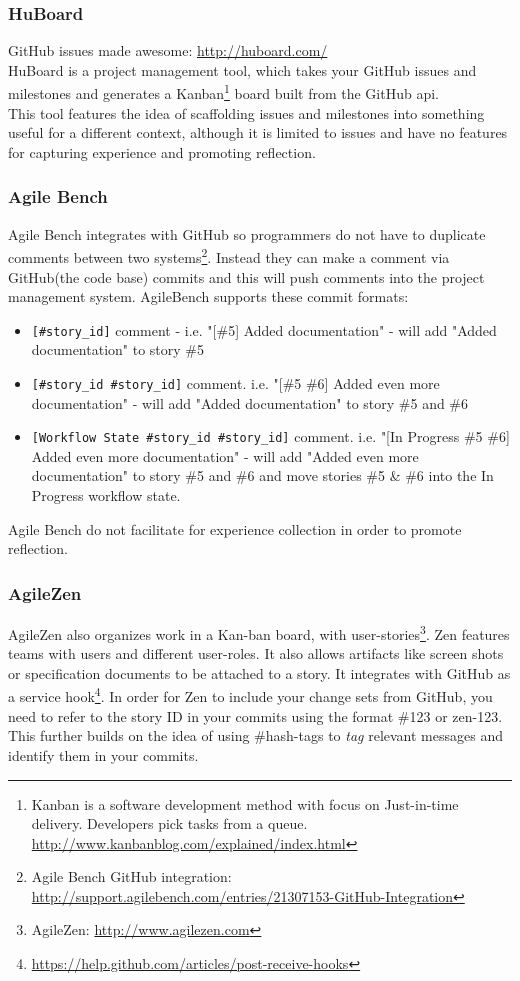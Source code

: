 \subsubsection*{HuBoard}
GitHub issues made awesome: \url{http://huboard.com/} \\
HuBoard is a project management tool, which takes your GitHub issues and milestones and generates a Kanban\footnote{Kanban is a software development method with focus on Just-in-time delivery. Developers pick tasks from a queue. \url{http://www.kanbanblog.com/explained/index.html}} board built from the GitHub api. \\
This tool features the idea of scaffolding issues and milestones into something useful for a different context, although it is limited to issues and have no features for capturing experience and promoting reflection. 
\subsubsection*{Agile Bench}
Agile Bench integrates with GitHub so programmers do not have to duplicate comments between two systems\footnote{Agile Bench GitHub integration: \url{http://support.agilebench.com/entries/21307153-GitHub-Integration}}. Instead they can make a comment via GitHub(the code base) commits and this will push comments into the project management system. AgileBench supports these commit formats:
\begin{itemize}
\item \verb|[#story_id]| comment - i.e. "[\#5] Added documentation" - will add "Added documentation" to story \#5
\item \verb|[#story_id #story_id]| comment. i.e. "[\#5 \#6] Added even more documentation" - will add "Added documentation" to story \#5 and \#6
\item \verb|[Workflow State #story_id #story_id]| comment. i.e. "[In Progress \#5 \#6] Added even more documentation" - will add "Added even more documentation" to story \#5 and \#6 and move stories \#5 \& \#6 into the In Progress workflow state.
\end{itemize}
Agile Bench do not facilitate for experience collection in order to promote reflection.
\subsubsection*{AgileZen}
AgileZen also organizes work in a Kan-ban board, with user-stories\footnote{AgileZen: \url{http://www.agilezen.com}}. Zen features teams with users and different user-roles. It also allows artifacts like screen shots or specification documents to be attached to a story. It integrates with GitHub as a service hook\footnote{\url{https://help.github.com/articles/post-receive-hooks}}. In order for Zen to include your change sets from GitHub, you need to refer to the story ID in your commits using the format \#123 or zen-123. This further builds on the idea of using \#hash-tags to \textit{tag} relevant messages and identify them in your commits. 

